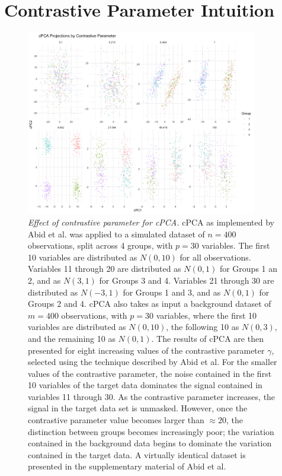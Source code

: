 \documentclass{article}
\begin{document}
\FloatBarrier

\newpage

\section{Contrastive Parameter Intuition}

\begin{figure}[!htbp]
    \centering
    \includegraphics[width=0.9\textwidth]{figures/cpca_example_plot}
    \caption{
    {\em Effect of contrastive parameter for cPCA.}
    cPCA as implemented by Abid et al. was applied to a simulated dataset of $n=400$ observations, split across 4 groups, with $p=30$ variables. The first 10 variables are distributed as $N(0, 10)$ for all observations. Variables 11
    through 20 are distributed as $N(0, 1)$ for Groups 1 an 2, and as $N(3, 1)$
    for Groups 3 and 4. Variables 21 through 30 are distributed as $N(-3, 1)$
    for Groups 1 and 3, and as $N(0, 1)$ for Groups 2 and 4. cPCA also takes
    as input a background dataset of $m=400$ observations, with $p=30$
    variables, where the first 10 variables are distributed as $N(0, 10)$, the
    following 10 as $N(0, 3)$, and the remaining 10 as $N(0, 1)$. The results
    of cPCA are then presented for eight increasing values of the contrastive
    parameter $\gamma$, selected using the technique described by Abid et al. For the smaller values of the contrastive parameter, the
    noise contained in the first 10 variables of the target data dominates the
    signal contained in variables 11 through 30. As the contrastive parameter
    increases, the signal in the target data set is unmasked. However, once the
    contrastive parameter value becomes larger than $\approx 20$, the
    distinction between groups becomes increasingly poor; the variation
    contained in the background data begins to dominate the variation contained
    in the target data. A virtually identical dataset is presented in the
    supplementary material of Abid et al. }
    \label{contrastive_par}
\end{figure}
\end{document}
